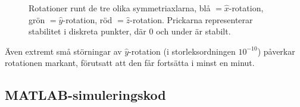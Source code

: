 \documentclass[12pt,a4paper]{article}
\begin{document}
\begin{figure}
\begin{center}
				\hspace{12pt}
			\end{center}
			\caption{Rotationer runt de tre olika symmetriaxlarna, blå $=\hat{x}$-rotation, grön $=\hat{y}$-rotation,
			röd $=\hat{z}$-rotation. Prickarna representerar stabilitet i diskreta punkter, där 0 och under är stabilt.}
		\end{figure}
		
		Även extremt små störningar av $\hat{y}$-rotation (i storleksordningen $10^{-10}$) påverkar rotationen markant,
		förutsatt att den får fortsätta i minst en minut.
		
		
\pagebreak

\begin{appendix}
	\section{MATLAB-simuleringskod}
	
		
		
		\begin{framed}
			
		\end{framed}
		
\end{appendix}
\end{document}

